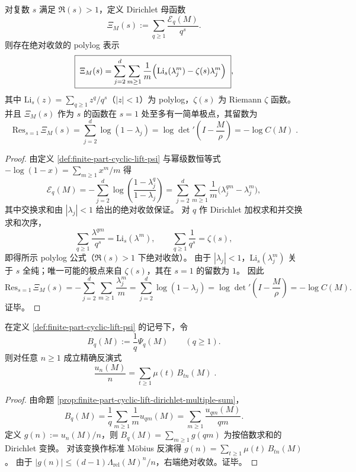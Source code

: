 \begin{theorem}\label{thm:finite-part-cyclic-lift-polylog-dirichlet-xi}
对复数 \(s\) 满足 \(\Re(s)>1\)，定义 Dirichlet 母函数
\[
\Xi_M(s):=\sum_{q\ge 1}\frac{\mathcal{E}_q(M)}{q^s}.
\]
则存在绝对收敛的 polylog 表示
\[
\boxed{\;
\Xi_M(s)=\sum_{j=2}^{d}\sum_{m\ge 1}\frac{1}{m}\Bigl(\mathrm{Li}_s(\lambda_j^{m})-\zeta(s)\lambda_j^{m}\Bigr)\; },
\]
其中 \(\mathrm{Li}_s(z)=\sum_{q\ge 1}z^{q}/q^{s}\)（\(|z|<1\)）为 polylog，\(\zeta(s)\) 为 Riemann \(\zeta\) 函数。
并且 \(\Xi_M(s)\) 作为 \(s\) 的函数在 \(s=1\) 处至多有一简单极点，其留数为
\[
\boxed{\;
\mathrm{Res}_{s=1}\,\Xi_M(s)
=\sum_{j=2}^{d}\log(1-\lambda_j)
=\log\det\nolimits'\!\left(I-\frac{M}{\rho}\right)
=-\log C(M)\; }.
\]
\end{theorem}
\begin{proof}
由定义 \ref{def:finite-part-cyclic-lift-psi} 与幂级数恒等式 \(-\log(1-x)=\sum_{m\ge 1}x^m/m\) 得
\[
\mathcal{E}_q(M)=-\sum_{j=2}^{d}\log\!\left(\frac{1-\lambda_j^{q}}{1-\lambda_j}\right)
=\sum_{j=2}^{d}\sum_{m\ge 1}\frac{1}{m}\bigl(\lambda_j^{qm}-\lambda_j^{m}\bigr),
\]
其中交换求和由 \(|\lambda_j|<1\) 给出的绝对收敛保证。
对 \(q\) 作 Dirichlet 加权求和并交换求和次序，
\[
\sum_{q\ge 1}\frac{\lambda^{qm}}{q^s}=\mathrm{Li}_s(\lambda^m),
\qquad
\sum_{q\ge 1}\frac{1}{q^s}=\zeta(s),
\]
即得所示 polylog 公式（\(\Re(s)>1\) 下绝对收敛）。
由于 \(|\lambda_j|<1\)，\(\mathrm{Li}_s(\lambda_j^m)\) 关于 \(s\) 全纯；唯一可能的极点来自 \(\zeta(s)\)，其在 \(s=1\) 的留数为 \(1\)。
因此
\[
\mathrm{Res}_{s=1}\,\Xi_M(s)
=-\sum_{j=2}^{d}\sum_{m\ge 1}\frac{\lambda_j^{m}}{m}
=\sum_{j=2}^{d}\log(1-\lambda_j)
=\log\det\nolimits'\!\left(I-\frac{M}{\rho}\right)
=-\log C(M).
\]
证毕。
\end{proof}

\begin{proposition}\label{prop:finite-part-cyclic-lift-mobius-inversion}
在定义 \ref{def:finite-part-cyclic-lift-psi} 的记号下，令
\[
B_q(M):=\frac{1}{q}\Psi_q(M)\qquad(q\ge 1).
\]
则对任意 \(n\ge 1\) 成立精确反演式
\[
\boxed{\;
\frac{u_n(M)}{n}=\sum_{t\ge 1}\mu(t)\,B_{tn}(M)\; }.
\]
\end{proposition}
\begin{proof}
由命题 \ref{prop:finite-part-cyclic-lift-dirichlet-multiple-sum}，
\[
B_q(M)=\frac{1}{q}\sum_{m\ge 1}\frac{1}{m}u_{qm}(M)=\sum_{m\ge 1}\frac{u_{qm}(M)}{qm}.
\]
定义 \(g(n):=u_n(M)/n\)，则 \(B_q(M)=\sum_{m\ge 1}g(qm)\) 为按倍数求和的 Dirichlet 变换。
对该变换作标准 Möbius 反演得
\(
g(n)=\sum_{t\ge 1}\mu(t)\,B_{tn}(M)
\)。
由于 \(|g(n)|\le (d-1)\Lambda_{\mathrm{rel}}(M)^n/n\)，右端绝对收敛。证毕。
\end{proof}

